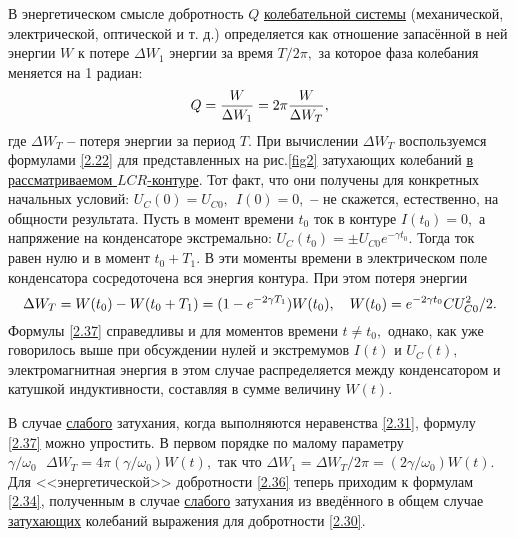 В энергетическом смысле добротность $Q$ \underline{колебательной системы} (механической, электрической, оптической и т. д.) определяется как отношение запасённой в ней энергии $W$ к потере $\Delta W_1$ энергии за время $T/2\pi,$ за которое фаза колебания меняется на 1 радиан:
\begin{equation}\eqmark{2.36}
Q=\dfrac{W}{\Delta W_1}=2\pi\dfrac{W}{\Delta W_T},
\end{equation}
где  $\Delta W_T$ \textbf{--} потеря энергии за период $T.$ При вычислении $\Delta W_T$ воспользуемся формулами \eqref{2.22} для представленных на рис.\ref{fig2} затухающих колебаний \underline{в рассматриваемом $LCR$-контуре}. Тот факт, что они получены для конкретных начальных условий: $U_C(0)=U_{C0},~~ I(0)=0,$ \textbf{--} не скажется, естественно, на общности результата. Пусть в момент времени $t_0$ ток в контуре $I(t_0)=0,$ а напряжение на конденсаторе экстремально: $U_C(t_0)=\pm U_{C0}e^{-\gamma t_0}.$ Тогда ток равен нулю и в момент $t_0+T_1.$ В эти моменты времени в электрическом поле конденсатора сосредоточена вся энергия контура. При этом потеря энергии
\begin{equation}\eqmark{2.37}
\Delta W_T=W(t_0)-W(t_0+T_1)=(1-e^{-2\gamma T_1})W(t_0),~~~
W(t_0)=e^{-2\gamma t_0}CU_{C0}^2/2.
\end{equation}
Формулы \eqref{2.37} справедливы и для моментов времени $t\ne t_0,$ однако, как уже говорилось выше при обсуждении нулей и экстремумов $I(t)$ и $U_C(t),$ электромагнитная энергия в этом случае распределяется между конденсатором и катушкой индуктивности, составляя в сумме величину $W(t).$

В случае \underline{слабого} затухания, когда выполняются неравенства \eqref{2.31}, формулу \eqref{2.37} можно упростить. В первом порядке по малому параметру $\gamma/\omega_0~~~\Delta W_T=4\pi(\gamma/\omega_0)W(t),$ так что $\Delta W_1=\Delta W_T/2\pi=(2\gamma/\omega_0)W(t).$ Для <<энергетической>> добротности \eqref{2.36} теперь приходим к формулам \eqref{2.34}, полученным в случае \underline{слабого} затухания из введённого в общем случае \underline{затухающих} колебаний выражения для добротности \eqref{2.30}.

